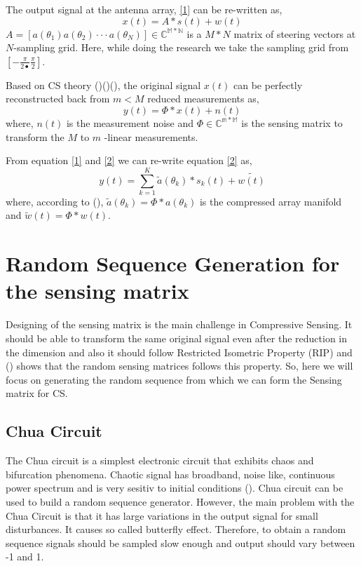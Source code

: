 \documentclass[10pt,conference]{IEEEtran}
\begin{document}
The output signal at the antenna array, \ref{1} can be re-written as,
\begin{equation} 
x(t)= A*s(t)+w(t)
\end{equation}
$A = [a(\theta_{1}) a(\theta_{2}) · · · a(\theta_{N})] \in \mathbb{C^{M*N}} $ is a  $M*N$ matrix of steering vectors at $N$-sampling grid. Here, while doing the research we take the sampling grid from $[-\frac{\pi}{2•} \frac{\pi}{2}]$.

Based on CS theory ()()(), the original signal $x(t)$ can be perfectly reconstructed back from $m < M$  reduced measurements as,
\begin{equation} \label{2}
y(t) = \Phi*x(t)+n(t)
\end{equation}
where, $n(t)$ is the measurement noise and $\Phi \in \mathbb{C^{m*M}}$ is the sensing matrix to transform the $M$ to $m$ -linear measurements.

From equation \ref{1} and \ref{2} we can re-write equation \ref{2} as,
\begin{equation}
y(t) = \sum_{k=1}^{K} \tilde{a}(\theta_{k})*s_{k}(t)+ \tilde{w(t)}
\end{equation} 
where, according to (), $\tilde{a}(\theta_{k}) = \Phi*a(\theta_{k})$ is the compressed array manifold and $\tilde{w}(t) = \Phi*w(t)$.







 
\section{Random Sequence Generation for the sensing matrix}\label{b}
Designing of the sensing matrix is the main challenge in Compressive Sensing. It should be able to transform the same original signal even after the reduction in the dimension and also it should follow Restricted Isometric Property (RIP) and () shows that the random sensing matrices follows this property. So, here we will focus on generating the random sequence from which we can form the Sensing matrix for CS.
\subsection{Chua Circuit}
The Chua circuit is a simplest electronic circuit that exhibits chaos and bifurcation phenomena. Chaotic signal has broadband, noise like, continuous power spectrum and is very sesitiv to initial conditions (). Chua circuit can be used to build a random sequence generator. However, the main problem with the Chua Circuit is that it has large variations in the output signal for small disturbances. It causes so called butterfly effect. Therefore, to obtain a random sequence signals should be sampled slow enough and output should vary between -1 and 1.
\end{document}

